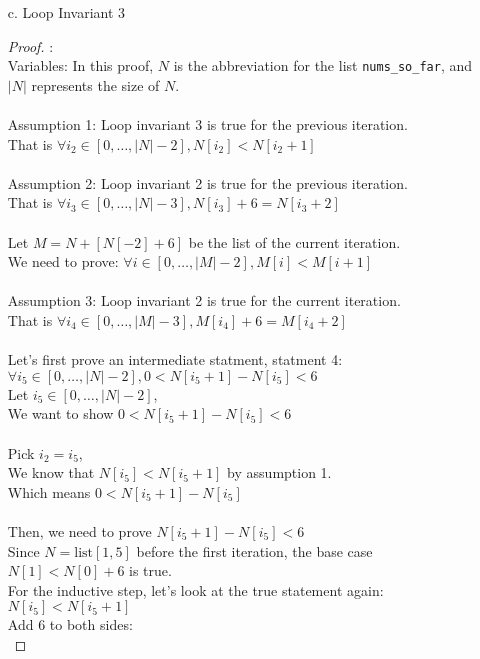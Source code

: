 \documentclass[fontsize=11pt]{article}
\begin{document}
\begin{enumerate}
\begin{enumerate}
\item[c.] Loop Invariant 3
\begin{proof} : \\
Variables: In this proof, $N$ is the abbreviation for the list \texttt{nums\_so\_far}, and $|N|$ represents the size of $N$. \\
\\
Assumption 1: Loop invariant 3 is true for the previous iteration. \\
That is $\forall i_2 \in [0, \dots, |N| - 2], N[i_2] <  N[i_2 + 1]$ \\
\\
Assumption 2: Loop invariant 2 is true for the previous iteration. \\
That is $\forall i_3 \in [0, \dots, |N| - 3], N[i_3] + 6 = N[i_3 + 2]$ \\
\\
Let $M = N + [N[-2] + 6]$ be the list of the current iteration. \\
We need to prove: $\forall i \in [0, \dots, |M| - 2], M[i] < M[i + 1] $ \\
\\
Assumption 3: Loop invariant 2 is true for the current iteration. \\
That is $\forall i_4 \in [0, \dots, |M| - 3], M[i_4] + 6 = M[i_4 + 2]$ \\
\\
Let's first prove an intermediate statment, statment 4: \\
$\forall i_5 \in [0, \dots, |N| - 2], 0 < N[i_5 + 1] - N[i_5] < 6$ \\
Let $i_5 \in [0, \dots, |N| - 2]$, \\
We want to show $0 < N[i_5 + 1] - N[i_5] < 6$ \\
\\
Pick $i_2 = i_5$, \\
We know that $N[i_5] < N[i_5 + 1]$ by assumption 1. \\
Which means $0 < N[i_5 + 1] - N[i_5]$ \\
\\
Then, we need to prove $N[i_5 + 1] - N[i_5] < 6$ \\
Since $N = \text{list}[1, 5]$ before the first iteration, the base case $N[1] < N[0] + 6$ is true. \\
For the inductive step, let's look at the true statement again: \\
$N[i_5] < N[i_5 + 1]$ \\
Add 6 to both sides: \\

\end{proof}
\end{enumerate}
\end{enumerate}
\end{document}
